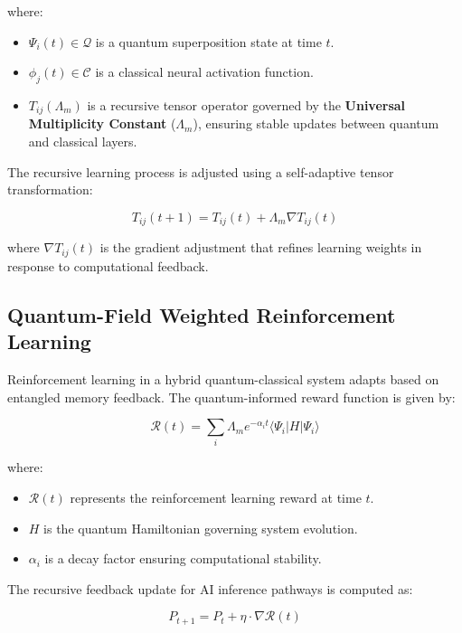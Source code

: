 \documentclass{article}
\theoremstyle{plain}
\begin{document}
where:
\begin{itemize}
    \item $\Psi_i(t) \in \mathcal{Q}$ is a quantum superposition state at time $t$.
    \item $\phi_j(t) \in \mathcal{C}$ is a classical neural activation function.
    \item $T_{ij}(\Lambda_m)$ is a recursive tensor operator governed by the \textbf{Universal Multiplicity Constant} ($\Lambda_m$), ensuring stable updates between quantum and classical layers.
\end{itemize}

The recursive learning process is adjusted using a self-adaptive tensor transformation:

\begin{equation}
    T_{ij}(t+1) = T_{ij}(t) + \Lambda_m \nabla T_{ij}(t)
\end{equation}

where $\nabla T_{ij}(t)$ is the gradient adjustment that refines learning weights in response to computational feedback.

\subsection{Quantum-Field Weighted Reinforcement Learning}

Reinforcement learning in a hybrid quantum-classical system adapts based on entangled memory feedback. The quantum-informed reward function is given by:

\begin{equation}
    \mathcal{R}(t) = \sum_{i} \Lambda_m e^{-\alpha_i t} \langle \Psi_i | H | \Psi_i \rangle
\end{equation}

where:
\begin{itemize}
    \item $\mathcal{R}(t)$ represents the reinforcement learning reward at time $t$.
    \item $H$ is the quantum Hamiltonian governing system evolution.
    \item $\alpha_i$ is a decay factor ensuring computational stability.
\end{itemize}

The recursive feedback update for AI inference pathways is computed as:

\begin{equation}
    P_{t+1} = P_t + \eta \cdot \nabla \mathcal{R}(t)
\end{equation}
\end{document}
